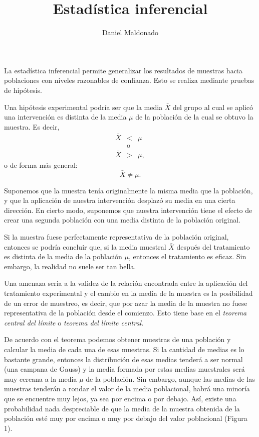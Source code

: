 \documentclass[a4paper,12pt]{article}
\title{Estadística inferencial}
\author{Daniel Maldonado}
\date{}
\begin{document}
{\scshape\bfseries \maketitle}

La estadística inferencial permite generalizar los resultados de muestras hacia poblaciones con niveles razonables de confianza. Esto se realiza mediante pruebas de hipótesis.

Una hipótesis experimental podría ser que la media $\bar{X}$ del grupo al cual se aplicó una intervención es distinta de la media $\mu$ de la población de la cual se obtuvo la muestra. Es decir,
\begin{eqnarray*}
    \bar{X} &<& \mu\\
            &\mbox{o}&\\
    \bar{X} &>& \mu,
\end{eqnarray*}
o de forma más general:
\[
    \bar{X} \neq \mu
.\]

Suponemos que la muestra tenía originalmente la misma media que la población, y que la aplicación de nuestra intervención desplazó su media en una cierta dirección. En cierto modo, suponemos que nuestra intervención tiene el efecto de crear una segunda población con una media distinta de la población original.

Si la muestra fuese perfectamente representativa de la población original, entonces se podría concluir que, si la media muestral $\bar{X}$ después del tratamiento es distinta de la media de la población $\mu$, entonces el tratamiento es eficaz. Sin embargo, la realidad no suele ser tan bella.

Una amenaza seria a la validez de la relación encontrada entre la aplicación del tratamiento experimental y el cambio en la media de la muestra es la posibilidad de un error de muestreo, es decir, que por azar la media de la muestra no fuese representativa de la población desde el comienzo. Esto tiene base en el {\slshape teorema central del límite} o {\slshape teorema del límite central}.

De acuerdo con el teorema podemos obtener muestras de una población y calcular la media de cada una de esas muestras. Si la cantidad de medias es lo bastante grande, entonces la distribución de esas medias tenderá a ser normal (una campana de Gauss) y la media formada por estas medias muestrales será muy cercana a la media $\mu$ de la población. Sin embargo, aunque las medias de las muestras tenderán a rondar el valor de la media poblacional, habrá una minoría que se encuentre muy lejos, ya sea por encima o por debajo. Así, existe una probabilidad nada despreciable de que la media de la muestra obtenida de la población esté muy por encima o muy por debajo del valor poblacional (Figura 1).
\end{document}
